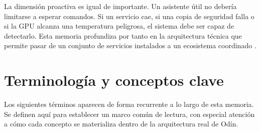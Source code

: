 La dimensión proactiva es igual de importante. Un asistente útil no debería limitarse a esperar comandos. Si un servicio cae, si una copia de seguridad falla o si la GPU alcanza una temperatura peligrosa, el sistema debe ser capaz de detectarlo. Esta memoria profundiza por tanto en la arquitectura técnica que permite pasar de un conjunto de servicios instalados a un ecosistema coordinado \cite{tennenhouse2000proactive}.

\section{Terminología y conceptos clave}
Los siguientes términos aparecen de forma recurrente a lo largo de esta memoria. Se definen aquí para establecer un marco común de lectura, con especial atención a cómo cada concepto se materializa dentro de la arquitectura real de Odín.

